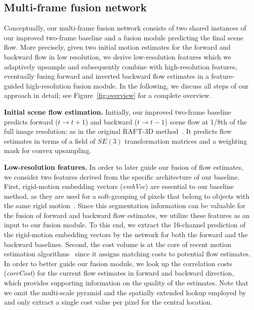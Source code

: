 \documentclass[10pt,twocolumn,letterpaper]{article}
\newcommand*\circled[1]{\tikz[baseline=(char.base)]{\node[shape=circle,draw,inner sep=0.5pt] (char) {#1};}}
\begin{document}
\subsection{Multi-frame fusion network}

Conceptually, our multi-frame fusion network consists of two shared instances of our improved two-frame baseline and a fusion module predicting the final scene flow.
More precisely, given two initial motion estimates for the forward and backward flow in low resolution, we derive low-resolution features which we adaptively upsample and subsequently combine with high-resolution features, eventually fusing forward and inverted backward flow estimates in a feature-guided high-resolution fusion module.
In the following, we discuss all steps of our approach in detail; see Figure~\ref{fig:overview} for a complete overview.


\medskip
\noindent
\circled{1} \textbf{Initial scene flow estimation.}
Initially, our improved two-frame baseline predicts forward ($t \rightarrow t\!+\!1$) and backward ($t \rightarrow \!t-\!1$) scene flow at 1/8th of the full image resolution; as in the original RAFT-3D method~\cite{Teed2021_RAFT3D}.
It predicts flow estimates in terms of a field of $SE(3)$ transformation matrices and a weighting mask for convex upsampling.



\medskip
\noindent
\circled{2} \textbf{Low-resolution features.}
In order to later guide our fusion of flow estimates, we consider two features derived from the specific architecture of our baseline.
First, rigid-motion embedding vectors (\emph{emb\-Vec}) are essential to our baseline method, as they are used for a soft-grouping of pixels that belong to objects with the same rigid motion~\cite{Teed2021_RAFT3D}.
Since this segmentation information can be valuable for the fusion of forward and backward flow estimates, we utilize these features as an input to our fusion module.
To this end, we extract the 16-channel prediction of the rigid-motion embedding vectors by the network for both the forward and the backward baselines.
Second, the cost volume is at the core of recent motion estimation algorithms~\cite{Sun2018_PWC,Teed2020_RAFT,Teed2021_RAFT3D} since it assigns matching costs to potential flow estimates.
In order to better guide our fusion module, we look up the correlation costs (\emph{corr\-Cost}) for the current flow estimates in forward and backward direction, which provides supporting information on the quality of the estimates.
Note that we omit the multi-scale pyramid and the spatially extended lookup employed by \cite{Teed2020_RAFT,Teed2021_RAFT3D} and only extract a single cost value per pixel for the central location.
\end{document}
